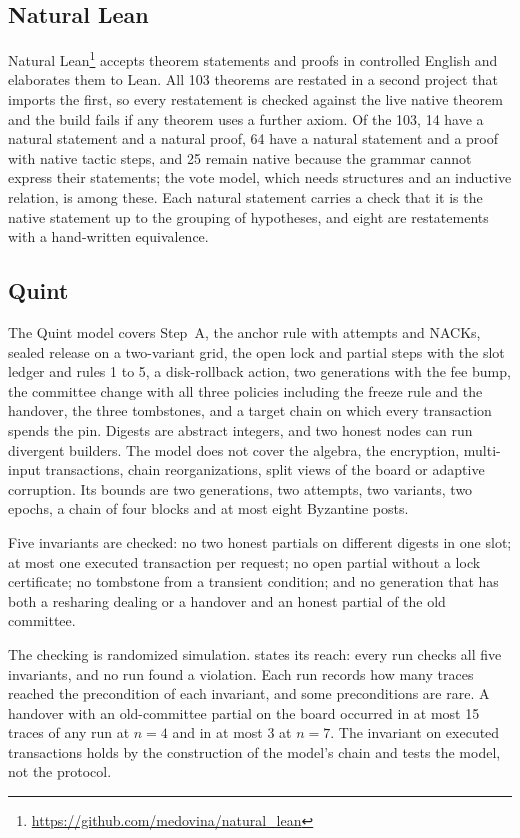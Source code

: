 \subsection{Natural Lean}

Natural Lean\footnote{\url{https://github.com/medovina/natural_lean}} accepts theorem statements and proofs in controlled English and elaborates them to Lean. All 103 theorems are restated in a second project that imports the first, so every restatement is checked against the live native theorem and the build fails if any theorem uses a further axiom. Of the 103, 14 have a natural statement and a natural proof, 64 have a natural statement and a proof with native tactic steps, and 25 remain native because the grammar cannot express their statements; the vote model, which needs structures and an inductive relation, is among these. Each natural statement carries a check that it is the native statement up to the grouping of hypotheses, and eight are restatements with a hand-written equivalence.

\subsection{Quint}

The Quint model covers Step~A, the anchor rule with attempts and NACKs, sealed release on a two-variant grid, the open lock and partial steps with the slot ledger and rules 1 to 5, a disk-rollback action, two generations with the fee bump, the committee change with all three policies including the freeze rule and the handover, the three tombstones, and a target chain on which every transaction spends the pin. Digests are abstract integers, and two honest nodes can run divergent builders. The model does not cover the algebra, the encryption, multi-input transactions, chain reorganizations, split views of the board or adaptive corruption. Its bounds are two generations, two attempts, two variants, two epochs, a chain of four blocks and at most eight Byzantine posts.

Five invariants are checked: no two honest partials on different digests in one slot; at most one executed transaction per request; no open partial without a lock certificate; no tombstone from a transient condition; and no generation that has both a resharing dealing or a handover and an honest partial of the old committee.

The checking is randomized simulation.  states its reach: every run checks all five invariants, and no run found a violation. Each run records how many traces reached the precondition of each invariant, and some preconditions are rare. A handover with an old-committee partial on the board occurred in at most 15 traces of any run at $n = 4$ and in at most 3 at $n = 7$. The invariant on executed transactions holds by the construction of the model's chain and tests the model, not the protocol.

